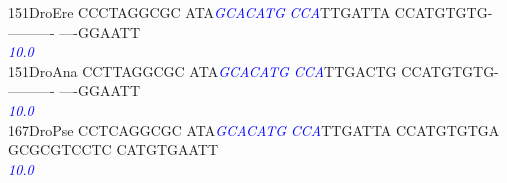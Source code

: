\documentclass[11pt,twoside,reqno,a4paper]{article}
\begin{document}
{151\hspace*{1\charwidth}DroEre	CCCTAGGCGC	ATA\textit{\textcolor{Blue}{G}}\textit{\textcolor{Blue}{C}}\textit{\textcolor{Blue}{A}}\textit{\textcolor{Blue}{C}}\textit{\textcolor{Blue}{A}}\textit{\textcolor{Blue}{T}}\textit{\textcolor{Blue}{G}}	\textit{\textcolor{Blue}{C}}\textit{\textcolor{Blue}{C}}\textit{\textcolor{Blue}{A}}TTGATTA	CCATGTGTG-	----------	----GGAATT	\\
\hspace*{4\charwidth}\hspace*{7\charwidth}\hspace*{1\charwidth}\hspace*{13\charwidth}\textit{\textcolor{Blue}{10.0}}\hspace*{1\charwidth}\hspace*{1\charwidth}\hspace*{1\charwidth}\hspace*{1\charwidth}\hspace*{1\charwidth}\\
151\hspace*{1\charwidth}DroAna	CCTTAGGCGC	ATA\textit{\textcolor{Blue}{G}}\textit{\textcolor{Blue}{C}}\textit{\textcolor{Blue}{A}}\textit{\textcolor{Blue}{C}}\textit{\textcolor{Blue}{A}}\textit{\textcolor{Blue}{T}}\textit{\textcolor{Blue}{G}}	\textit{\textcolor{Blue}{C}}\textit{\textcolor{Blue}{C}}\textit{\textcolor{Blue}{A}}TTGACTG	CCATGTGTG-	----------	----GGAATT	\\
\hspace*{4\charwidth}\hspace*{7\charwidth}\hspace*{1\charwidth}\hspace*{13\charwidth}\textit{\textcolor{Blue}{10.0}}\hspace*{1\charwidth}\hspace*{1\charwidth}\hspace*{1\charwidth}\hspace*{1\charwidth}\hspace*{1\charwidth}\\
167\hspace*{1\charwidth}DroPse	CCTCAGGCGC	ATA\textit{\textcolor{Blue}{G}}\textit{\textcolor{Blue}{C}}\textit{\textcolor{Blue}{A}}\textit{\textcolor{Blue}{C}}\textit{\textcolor{Blue}{A}}\textit{\textcolor{Blue}{T}}\textit{\textcolor{Blue}{G}}	\textit{\textcolor{Blue}{C}}\textit{\textcolor{Blue}{C}}\textit{\textcolor{Blue}{A}}TTGATTA	CCATGTGTGA	GCGCGTCCTC	CATGTGAATT	\\
\hspace*{4\charwidth}\hspace*{7\charwidth}\hspace*{1\charwidth}\hspace*{13\charwidth}\textit{\textcolor{Blue}{10.0}}\hspace*{1\charwidth}\hspace*{1\charwidth}\hspace*{1\charwidth}\hspace*{1\charwidth}\hspace*{1\charwidth}\\
}
\end{document}
